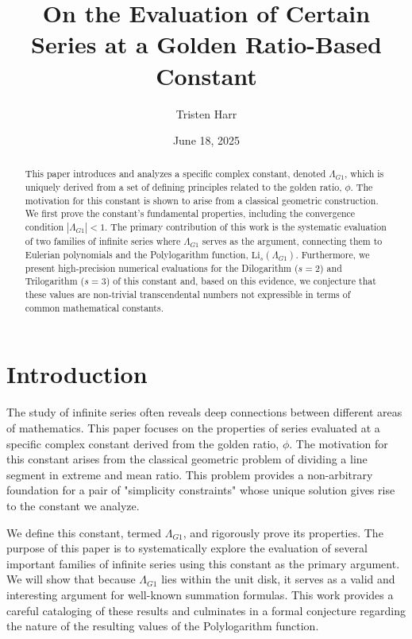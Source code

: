 \documentclass{amsart}
\theoremstyle{plain}
\theoremstyle{definition}
\theoremstyle{remark}
\newcommand{\LambdaG}{\Lambda_{G1}}
\begin{document}
\title[Series Evaluations at a Golden Ratio Constant]{On the Evaluation of Certain Series at a Golden Ratio-Based Constant}
\author{Tristen Harr}
\date{June 18, 2025}

\begin{abstract}
This paper introduces and analyzes a specific complex constant, denoted $\Lambda_{G1}$, which is uniquely derived from a set of defining principles related to the golden ratio, $\phi$. The motivation for this constant is shown to arise from a classical geometric construction. We first prove the constant's fundamental properties, including the convergence condition $|\LambdaG| < 1$. The primary contribution of this work is the systematic evaluation of two families of infinite series where $\LambdaG$ serves as the argument, connecting them to Eulerian polynomials and the Polylogarithm function, $\mathrm{Li}_s(\LambdaG)$. Furthermore, we present high-precision numerical evaluations for the Dilogarithm ($s=2$) and Trilogarithm ($s=3$) of this constant and, based on this evidence, we conjecture that these values are non-trivial transcendental numbers not expressible in terms of common mathematical constants.
\end{abstract}

\maketitle

\section{Introduction}
The study of infinite series often reveals deep connections between different areas of mathematics. This paper focuses on the properties of series evaluated at a specific complex constant derived from the golden ratio, $\phi$. The motivation for this constant arises from the classical geometric problem of dividing a line segment in extreme and mean ratio. This problem provides a non-arbitrary foundation for a pair of "simplicity constraints" whose unique solution gives rise to the constant we analyze.

We define this constant, termed $\LambdaG$, and rigorously prove its properties. The purpose of this paper is to systematically explore the evaluation of several important families of infinite series using this constant as the primary argument. We will show that because $\LambdaG$ lies within the unit disk, it serves as a valid and interesting argument for well-known summation formulas. This work provides a careful cataloging of these results and culminates in a formal conjecture regarding the nature of the resulting values of the Polylogarithm function.
\end{document}

